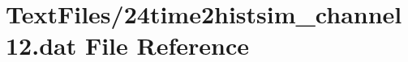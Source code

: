 \hypertarget{24time2histsim__channel12_8dat}{}\section{Text\+Files/24time2histsim\+\_\+channel12.dat File Reference}
\label{24time2histsim__channel12_8dat}
